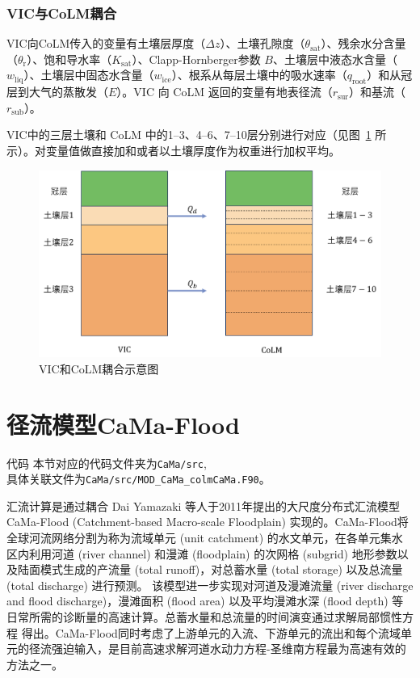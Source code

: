 \subsubsection{VIC与CoLM耦合} %

    VIC向CoLM传入的变量有土壤层厚度（$\Delta z$）、土壤孔隙度（$\theta_{\text{sat}}$）、残余水分含量（$\theta_\text{r}$）、饱和导水率（$K_{\text{sat}}$）、Clapp-Hornberger参数 $B$、土壤层中液态水含量（$w_{\text{liq}}$）、土壤层中固态水含量（$w_{\text{ice}}$）、根系从每层土壤中的吸水速率（$q_{\text{root}}$）和从冠层到大气的蒸散发（$E$）。VIC 向 CoLM 返回的变量有地表径流（$r_{\text{sur}}$）和基流（$r_{\text{sub}}$）。

    VIC中的三层土壤和 CoLM 中的1--3、4--6、7--10层分别进行对应（见图~\ref{fig:VIC和CoLM耦合示意图} 所示）。对变量值做直接加和或者以土壤厚度作为权重进行加权平均。

    {
      \begin{figure}[htbp]
        \centering
        \includegraphics[width=\textwidth]{Figures/陆地表面的水分循环/VIC说明图中文.pdf}
        \caption{VIC和CoLM耦合示意图}
        \label{fig:VIC和CoLM耦合示意图}
      \end{figure}
    }


\section{径流模型CaMa-Flood}
\begin{mymdframed}{代码}
  本节对应的代码文件夹为\texttt{CaMa/src},\\具体关联文件为\texttt{CaMa/src/MOD\_CaMa\_colmCaMa.F90}。
\end{mymdframed}

汇流计算是通过耦合 Dai Yamazaki 等人于2011年提出的大尺度分布式汇流模型 CaMa-Flood (Catchment-based Macro-scale Floodplain) 实现的\citep{yamazaki2011physically}。CaMa-Flood将全球河流网络分割为称为流域单元 (unit catchment) 的水文单元，在各单元集水区内利用河道 (river channel) 和漫滩 (floodplain) 的次网格 (subgrid) 地形参数以及陆面模式生成的产流量 (total runoff)，对总蓄水量 (total storage) 以及总流量 (total discharge) 进行预测。
该模型进一步实现对河道及漫滩流量 (river discharge and flood discharge)，漫滩面积 (flood area) 以及平均漫滩水深 (flood depth) 等日常所需的诊断量的高速计算。总蓄水量和总流量的时间演变通过求解局部惯性方程 \citep{bates2010} 得出。CaMa-Flood同时考虑了上游单元的入流、下游单元的流出和每个流域单元的径流强迫输入，是目前高速求解河道水动力方程-圣维南方程最为高速有效的方法之一。


